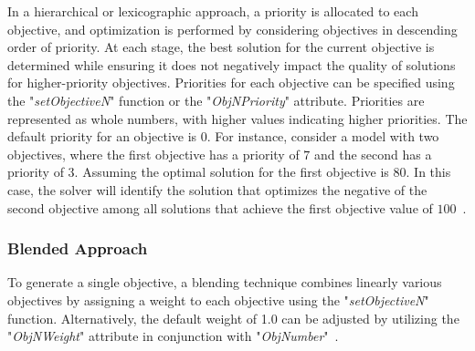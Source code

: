     In a hierarchical or lexicographic approach, a priority is allocated to each objective, and optimization is performed by considering objectives in descending order of priority. At each stage, the best solution for the current objective is determined while ensuring it does not negatively impact the quality of solutions for higher-priority objectives. Priorities for each objective can be specified using the "\textit{setObjectiveN}" function or the "\textit{ObjNPriority}" attribute. Priorities are represented as whole numbers, with higher values indicating higher priorities. The default priority for an objective is $0$.
    For instance, consider a model with two objectives, where the first objective has a priority of $7$ and the second has a priority of $3$. Assuming the optimal solution for the first objective is $80$. In this case, the solver will identify the solution that optimizes the negative of the second objective among all solutions that achieve the first objective value of $100$~\cite{gurobi, askaripoor2023designer}.
    
    
    
    
    
    \subsubsection{Blended Approach}
    
    To generate a single objective, a blending technique combines linearly various objectives by assigning a weight to each objective using the "\textit{setObjectiveN}" function. Alternatively, the default weight of 1.0 can be adjusted by utilizing the "\textit{ObjNWeight}" attribute in conjunction with "\textit{ObjNumber}"~\cite{gurobi}.

